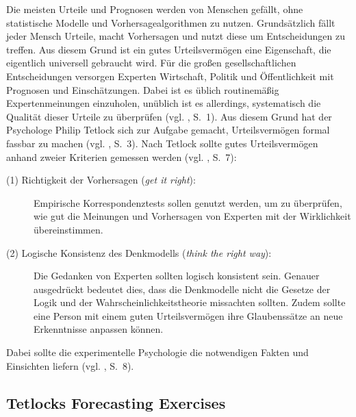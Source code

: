 Die meisten Urteile und Prognosen werden von Menschen gefällt, ohne statistische
Modelle und Vorhersagealgorithmen zu nutzen. Grundsätzlich fällt jeder Mensch
Urteile, macht Vorhersagen und nutzt diese um Entscheidungen zu treffen. Aus
diesem Grund ist ein gutes Urteilsvermögen eine Eigenschaft, die eigentlich
universell gebraucht wird. Für die großen gesellschaftlichen Entscheidungen
versorgen Experten Wirtschaft, Politik und Öffentlichkeit mit Prognosen und
Einschätzungen. Dabei ist es üblich routinemäßig Expertenmeinungen einzuholen,
unüblich ist es allerdings, systematisch die Qualität dieser Urteile zu
überprüfen (vgl. \cite{Tetlock}, S.~1). Aus diesem Grund hat der Psychologe
Philip Tetlock sich zur Aufgabe gemacht,  Urteilsvermögen\grqq
formal fassbar zu machen (vgl. \cite{Tetlock}, S.~3). Nach Tetlock sollte gutes
Urteilsvermögen anhand zweier Kriterien gemessen werden (vgl. \cite{Tetlock},
S.~7):
\begin{description}
\item[(1) Richtigkeit der Vorhersagen (\emph{get it right}):]
\label{misc:Emp_Korr}
Empirische Korrespondenztests sollen genutzt werden, um zu überprüfen, wie gut
die Meinungen und Vorhersagen von Experten mit der Wirklichkeit übereinstimmen.
\item[(2) Logische Konsistenz des Denkmodells (\emph{think the right way}):]
Die Gedanken von Experten sollten logisch konsistent sein. Genauer ausgedrückt
bedeutet dies, dass die Denkmodelle nicht die Gesetze der Logik und der
Wahrscheinlichkeitstheorie missachten sollten. Zudem sollte eine Person mit
einem guten Urteilsvermögen ihre Glaubenssätze an neue Erkenntnisse anpassen
können.
\end{description}
Dabei sollte die experimentelle Psychologie die notwendigen Fakten und
Einsichten liefern (vgl. \cite{Tetlock}, S.~8).

\subsection{Tetlocks Forecasting Exercises}

